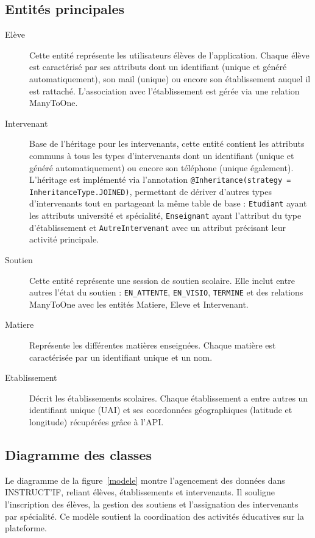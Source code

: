 \subsection{Entités principales}
\begin{description}
    \item[Elève] Cette entité représente les utilisateurs élèves de l'application. Chaque élève est caractérisé par  ses attributs dont un identifiant (unique et généré automatiquement), son mail (unique) ou encore son établissement auquel il est rattaché. L'association avec l'établissement est gérée via une relation ManyToOne.\newline
    \item[Intervenant] Base de l'héritage pour les intervenants, cette entité contient les attributs communs à tous les types d'intervenants dont un identifiant (unique et généré automatiquement) ou encore son téléphone (unique également). L'héritage est implémenté via l'annotation \texttt{@Inheritance(strategy = InheritanceType.JOINED)}, permettant de dériver d'autres types d'intervenants tout en partageant la même table de base : \texttt{Etudiant} ayant les attributs université et spécialité, \texttt{Enseignant} ayant l'attribut du type d'établissement et \texttt{AutreIntervenant} avec un attribut précisant leur activité principale.
\newline
    \item[Soutien]Cette entité représente une session de soutien scolaire. Elle inclut entre autres l'état du soutien : \texttt{EN\_ATTENTE}, \texttt{EN\_VISIO}, \texttt{TERMINE} et des relations ManyToOne avec les entités Matiere, Eleve et Intervenant.
\newline
\item[Matiere]Représente les différentes matières enseignées. Chaque matière est caractérisée par un identifiant unique et un nom.
\newline
\item[Etablissement]Décrit les établissements scolaires. Chaque établissement a entre autres un identifiant unique (UAI) et ses coordonnées géographiques (latitude et longitude) récupérées grâce à l'API.
\newline
\end{description}


\subsection{Diagramme des classes}

Le diagramme de la figure~\ref{modele} montre l'agencement des données dans INSTRUCT'IF, reliant élèves, établissements et intervenants. Il souligne l'inscription des élèves, la gestion des soutiens et l'assignation des intervenants par spécialité. Ce modèle soutient la coordination des activités éducatives sur la plateforme.

